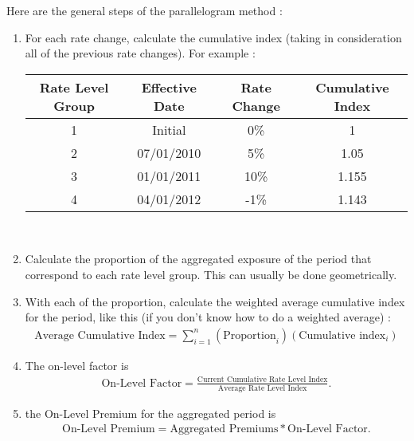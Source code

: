 \documentclass[11pt, english]{memoir}
\numberwithin{definition}{section}
\begin{document}
	Here are the general steps of the parallelogram method :
	\begin{tcolorbox}
		\begin{enumerate}
			\item For each rate change, calculate the cumulative index (taking in consideration all of the previous rate changes). For example :  
			
			\begin{tabular}{cccc}
				\toprule
				Rate Level Group & Effective Date & Rate Change & Cumulative Index \\
				\midrule
				1 & Initial & 0\% & 1 \\
				2 & 07/01/2010 & 5\% & 1.05\\
				3 & 01/01/2011 & 10\% & 1.155\\
				4 & 04/01/2012 & -1\% & 1.143\\
				\bottomrule
			\end{tabular}  \\
		
			\item  Calculate the proportion of the aggregated exposure of the period that correspond to each rate level group. This can usually be done geometrically. 
			\item With each of the proportion, calculate the weighted average cumulative index for the period, like this (if you don't know how to do a weighted average) :
			 \begin{align*}
			 \text{Average Cumulative Index} = \sum_{i = 1}^{n} (\text{Proportion}_{i})(\text{Cumulative index}_{i})
			 \end{align*}
			\item The on-level factor is 
			\begin{align*}
			\text{On-Level Factor} = \frac{\text{Current Cumulative Rate Level Index}}{\text{Average Rate Level Index}}.
			\end{align*}
			\item the On-Level Premium for the aggregated period is 
			\begin{align*}
			\text{On-Level Premium} = \text{Aggregated Premiums} * \text{On-Level Factor}.
			\end{align*}
		\end{enumerate}
	\end{tcolorbox}
	
\end{document}
